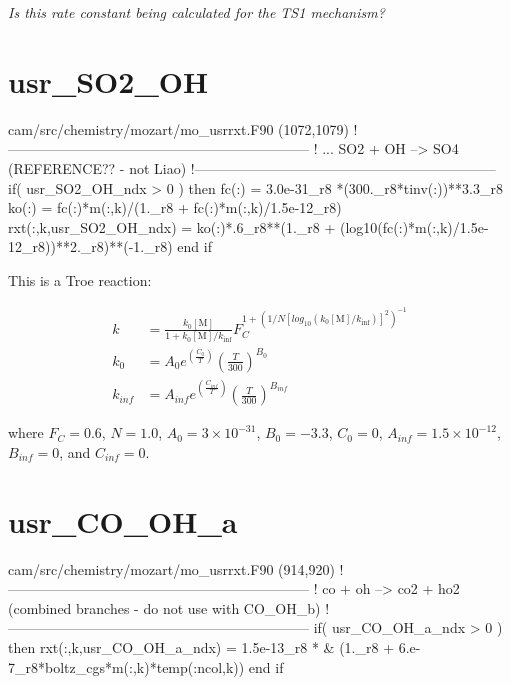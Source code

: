 \documentclass[titlepage]{article}
\begin{document}
\textit{\Large Is this rate constant being calculated for the TS1 mechanism?}


\section{usr\_SO2\_OH}

\begin{blockcode}[commandchars=\\\{\}]
\color{gray}cam/src/chemistry/mozart/mo_usrrxt.F90 (1072,1079)
!-----------------------------------------------------------------
!       ... SO2 + OH  --> SO4  (REFERENCE?? - not Liao)
!-----------------------------------------------------------------
       if( usr_SO2_OH_ndx > 0 ) then
          fc(:) = 3.0e-31_r8 *(300._r8*tinv(:))**3.3_r8
          ko(:) = fc(:)*m(:,k)/(1._r8 + fc(:)*m(:,k)/1.5e-12_r8)
          rxt(:,k,usr_SO2_OH_ndx) = ko(:)*.6_r8**(1._r8 + (log10(fc(:)*m(:,k)/1.5e-12_r8))**2._r8)**(-1._r8)
       end if
\end{blockcode}

This is a Troe reaction:

\begin{equation}
\begin{split}
k & = \frac{k_0[\mbox{M}]}{1+k_0[\mbox{M}]/k_{\inf}}F_C^{1+(1/N[log_{10}(k_0[\mbox{M}]/k_{\inf})]^2)^{-1}} \\
k_0 & = A_0 e^{\left( \frac{C_0}{T} \right)} \left( \frac{T}{300} \right)^{B_0} \\
k_{inf} & = A_{inf} e^{\left( \frac{C_{inf}}{T} \right)} \left( \frac{T}{300} \right)^{B_{inf}}
\end{split}
\end{equation}

\noindent where $F_C = 0.6$, $N = 1.0$, $A_0 = 3 \times 10^{-31}$, $B_0 = -3.3$, $C_0 = 0$, $A_{inf} = 1.5 \times 10^{-12}$, $B_{inf} = 0$, and $C_{inf} = 0$.


\section{usr\_CO\_OH\_a}

\begin{blockcode}[commandchars=\\\{\}]
\color{gray}cam/src/chemistry/mozart/mo_usrrxt.F90 (914,920)
!-----------------------------------------------------------------
!           co + oh --> co2 + ho2     (combined branches - do not use with CO_OH_b)
!-----------------------------------------------------------------
       if( usr_CO_OH_a_ndx > 0 ) then
          rxt(:,k,usr_CO_OH_a_ndx) = 1.5e-13_r8 * &
               (1._r8 + 6.e-7_r8*boltz_cgs*m(:,k)*temp(:ncol,k))
       end if
\end{blockcode}
\end{document}
